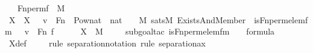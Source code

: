 \begin{isabellebody}
\ \ \ {\isachardoublequoteopen}Fn{\isacharunderscore}{\kern0pt}perm{\isacharprime}{\kern0pt}{\isacharparenleft}{\kern0pt}f{\isacharparenright}{\kern0pt}\ {\isasymin}\ M{\isachardoublequoteclose}\ \isanewline
%
\isadelimproof
%
\endisadelimproof
%
\isatagproof
{}\isamarkupfalse%
\ {\isacharminus}{\kern0pt}\ \ \ \ \isanewline
\isanewline
\ \ \isamarkupfalse%
\ X\ \ {\isachardoublequoteopen}X\ {\isasymequiv}\ {\isacharbraceleft}{\kern0pt}\ v\ {\isasymin}\ Fn\ {\isasymtimes}\ {\isacharparenleft}{\kern0pt}Pow{\isacharparenleft}{\kern0pt}{\isacharparenleft}{\kern0pt}nat\ {\isasymtimes}\ nat{\isacharparenright}{\kern0pt}\ {\isasymtimes}\ {}{\isacharparenright}{\kern0pt}\ {\isasyminter}\ M{\isacharparenright}{\kern0pt}{\isachardot}{\kern0pt}\ sats{\isacharparenleft}{\kern0pt}M{\isacharcomma}{\kern0pt}\ Exists{\isacharparenleft}{\kern0pt}And{\isacharparenleft}{\kern0pt}Member{\isacharparenleft}{\kern0pt}{}{\isacharcomma}{\kern0pt}\ {}{\isacharparenright}{\kern0pt}{\isacharcomma}{\kern0pt}\ is{\isacharunderscore}{\kern0pt}Fn{\isacharunderscore}{\kern0pt}perm{\isacharprime}{\kern0pt}{\isacharunderscore}{\kern0pt}elem{\isacharunderscore}{\kern0pt}fm{\isacharparenleft}{\kern0pt}{}{\isacharcomma}{\kern0pt}\ {}{\isacharcomma}{\kern0pt}\ {}{\isacharparenright}{\kern0pt}{\isacharparenright}{\kern0pt}{\isacharparenright}{\kern0pt}{\isacharcomma}{\kern0pt}\ {\isacharbrackleft}{\kern0pt}v{\isacharbrackright}{\kern0pt}\ {\isacharat}{\kern0pt}\ {\isacharbrackleft}{\kern0pt}Fn{\isacharcomma}{\kern0pt}\ f{\isacharbrackright}{\kern0pt}{\isacharparenright}{\kern0pt}\ {\isacharbraceright}{\kern0pt}{\isachardoublequoteclose}\ \isanewline
\isanewline
\ \ \isamarkupfalse%
\ {\isachardoublequoteopen}X\ {\isasymin}\ M{\isachardoublequoteclose}\isanewline
\ \ \ \ \isamarkupfalse%
{\isacharparenleft}{\kern0pt}subgoal{\isacharunderscore}{\kern0pt}tac\ {\isachardoublequoteopen}is{\isacharunderscore}{\kern0pt}Fn{\isacharunderscore}{\kern0pt}perm{\isacharprime}{\kern0pt}{\isacharunderscore}{\kern0pt}elem{\isacharunderscore}{\kern0pt}fm{\isacharparenleft}{\kern0pt}{}{\isacharcomma}{\kern0pt}\ {}{\isacharcomma}{\kern0pt}\ {}{\isacharparenright}{\kern0pt}\ {\isasymin}\ formula{\isachardoublequoteclose}{\isacharparenright}{\kern0pt}\isanewline
\ \ \ \ \isamarkupfalse%
\ X{\isacharunderscore}{\kern0pt}def\isanewline
\ \ \ \ \isamarkupfalse%
{\isacharparenleft}{\kern0pt}rule\ separation{\isacharunderscore}{\kern0pt}notation{\isacharcomma}{\kern0pt}\ rule\ separation{\isacharunderscore}{\kern0pt}ax{\isacharparenright}{\kern0pt}\isanewline

\end{isabellebody}
